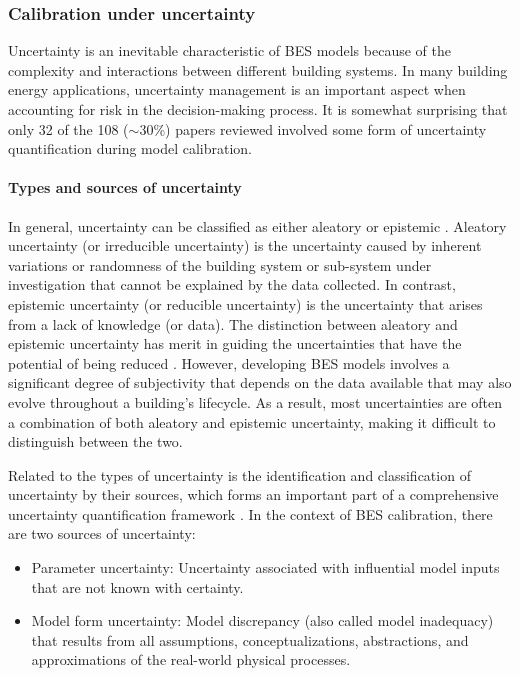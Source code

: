 \documentclass[review]{elsarticle}
\begin{document}
\subsubsection{Calibration under uncertainty}

Uncertainty is an inevitable characteristic of BES models because of the complexity and interactions between different building systems. In many building energy applications, uncertainty management is an important aspect when accounting for risk in the decision-making process. It is somewhat surprising that only 32 of the 108 ($\sim$30\%) papers reviewed involved some form of uncertainty quantification during model calibration. 

\paragraph{Types and sources of uncertainty}

In general, uncertainty can be classified as either aleatory or epistemic \cite{tian2018review, roy2011comprehensive}. Aleatory uncertainty (or irreducible uncertainty) is the uncertainty caused by inherent variations or randomness of the building system or sub-system under investigation that cannot be explained by the data collected. In contrast, epistemic uncertainty (or reducible uncertainty) is the uncertainty that arises from a lack of knowledge (or data). The distinction between aleatory and epistemic uncertainty has merit in guiding the uncertainties that have the potential of being reduced \cite{der2009aleatory}. However, developing BES models involves a significant degree of subjectivity that depends on the data available that may also evolve throughout a building's lifecycle. As a result, most uncertainties are often a combination of both aleatory and epistemic uncertainty, making it difficult to distinguish between the two. 

Related to the types of uncertainty is the identification and classification of uncertainty by their sources, which forms an important part of a comprehensive uncertainty quantification framework \cite{roy2011comprehensive, sun2014closing}. In the context of BES calibration, there are two sources of uncertainty:
\begin{itemize}
    \item Parameter uncertainty: Uncertainty associated with influential model inputs that are not known with certainty. 
    \item Model form uncertainty: Model discrepancy (also called model inadequacy) that results from all assumptions, conceptualizations, abstractions, and approximations of the real-world physical processes. 
\end{itemize}
\end{document}
